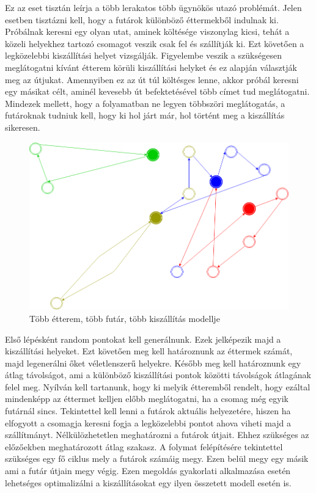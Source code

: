 

Ez az eset tisztán leírja a több lerakatos több ügynökös utazó problémát. Jelen esetben tisztázni kell, hogy a futárok különböző éttermekből indulnak ki. Próbálnak keresni egy olyan utat, aminek költésége viszonylag kicsi, tehát a közeli helyekhez tartozó csomagot veszik csak fel és szállítják ki. Ezt követően a legközelebbi kiszállítási helyet vizsgálják. Figyelembe veszik a szükségesen meglátogatni kívánt étterem körüli kiszállítási helyket és ez alapján választják meg az útjukat. Amennyiben ez az út túl költésges lenne, akkor próbál keresni egy másikat célt, aminél kevesebb út befektetésével több címet tud meglátogatni. Mindezek mellett, hogy a folyamatban ne legyen többszöri meglátogatás, a futároknak tudniuk kell, hogy ki hol járt már, hol történt meg a kiszállítás sikeresen.

\begin{figure}[h!]
\centering
\includegraphics[scale=0.45]{images/model5.png}
\caption{Több étterem, több futár, több kiszállítás modellje}
\label{fig:model5}
\end{figure}



Első lépésként random pontokat kell generálnunk. Ezek jelképezik majd a kiszállítási helyeket. Ezt követően meg kell határoznunk az éttermek számát, majd legenerálni őket véletlenszerű helyekre. Később meg kell határoznunk egy átlag távolságot, ami a különböző kiszállítási pontok közötti távolságok átlagának felel meg. Nyílván kell tartanunk, hogy ki melyik étteremből rendelt, hogy ezáltal mindenképp az éttermet kelljen előbb meglátogatni, ha a csomag még egyik futárnál sincs. Tekintettel kell lenni a futárok aktuális helyezetére, hiszen ha elfogyott a csomagja keresni fogja a legközelebbi pontot ahova viheti majd a szállítmányt. Nélkülözhetetlen meghatározni a futárok útjait. Ehhez szükséges az előzőekben meghatározott átlag szakasz. A folymat felépítésére tekintettel szükséges egy fő ciklus mely a futárok számáig megy. Ezen belül megy egy másik ami a futár útjain megy végig. Ezen megoldás gyakorlati alkalmazása esetén lehetséges optimalizálni a kiszállításokat egy ilyen összetett modell esetén is.